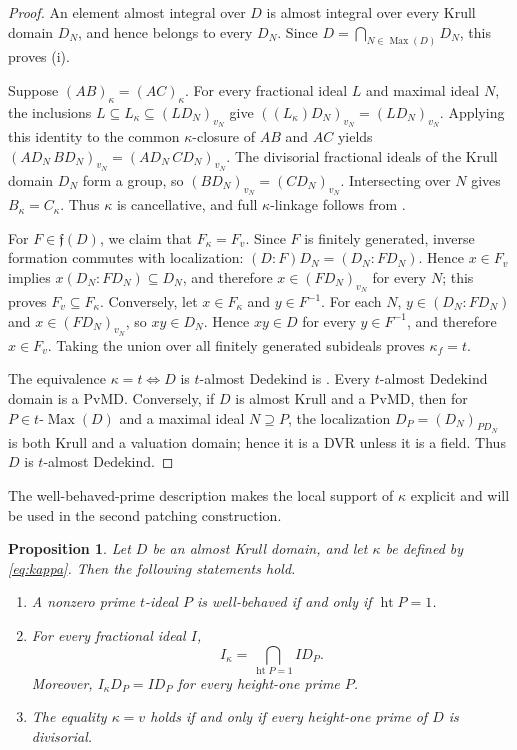 \documentclass[11pt]{amsart}
\newtheorem{proposition}[proposition]{Proposition}
\theoremstyle{definition}
\theoremstyle{remark}
\newcommand{\fcal}{\mathfrak f}
\newcommand{\PvMD}{\mathrm{PvMD}}
\newcommand{\Max}{\operatorname{Max}}
\newcommand{\tMax}{t\text{-}\operatorname{Max}}
\begin{document}
\begin{proof}
An element almost integral over $D$ is almost integral over every Krull domain
$D_N$, and hence belongs to every $D_N$.  Since
$D=\bigcap_{N\in\Max(D)}D_N$, this proves (i).

Suppose $(AB)_\kappa=(AC)_\kappa$.  For every fractional ideal $L$ and
maximal ideal $N$, the inclusions
$L\subseteq L_\kappa\subseteq(LD_N)_{v_N}$ give
$((L_\kappa)D_N)_{v_N}=(LD_N)_{v_N}$.  Applying this identity to the common
$\kappa$-closure of $AB$ and $AC$ yields
$(AD_N\,BD_N)_{v_N}=(AD_N\,CD_N)_{v_N}$.  The divisorial fractional ideals of the
Krull domain $D_N$ form a group, so
$(BD_N)_{v_N}=(CD_N)_{v_N}$.  Intersecting over $N$ gives
$B_\kappa=C_\kappa$.  Thus $\kappa$ is cancellative, and full
$\kappa$-linkage follows from .

For $F\in\fcal(D)$, we claim that $F_\kappa=F_v$.  Since $F$ is finitely
generated, inverse formation commutes with localization:
$(D:F)D_N=(D_N:FD_N)$.  Hence $x\in F_v$ implies
$x(D_N:FD_N)\subseteq D_N$, and therefore
$x\in(FD_N)_{v_N}$ for every $N$; this proves $F_v\subseteq F_\kappa$.
Conversely, let $x\in F_\kappa$ and $y\in F^{-1}$.  For each $N$,
$y\in(D_N:FD_N)$ and $x\in(FD_N)_{v_N}$, so $xy\in D_N$.  Hence
$xy\in D$ for every $y\in F^{-1}$, and therefore $x\in F_v$.  Taking the
union over all finitely generated subideals proves $\kappa_f=t$.

The equivalence $\kappa=t\iff D$ is $t$-almost Dedekind is
\cite[Propositions~1.6 and~1.7]{ElBaghdadiIzelgueTamoussit}.  Every
$t$-almost Dedekind domain is a $\PvMD$.  Conversely, if $D$ is almost Krull
and a $\PvMD$, then for $P\in\tMax(D)$ and a maximal ideal $N\supseteq P$,
the localization $D_P=(D_N)_{PD_N}$ is both Krull and a valuation domain;
hence it is a DVR unless it is a field.  Thus $D$ is $t$-almost Dedekind.
\end{proof}

The well-behaved-prime description makes the local support of $\kappa$
explicit and will be used in the second patching construction.

\begin{proposition}\label{prop:well-behaved}
Let $D$ be an almost Krull domain, and let $\kappa$ be defined by
\eqref{eq:kappa}.  Then the following statements hold.
\begin{enumerate}[label=\textup{(\roman*)}]
\item A nonzero prime $t$-ideal $P$ is well-behaved if and only if
      $\operatorname{ht}P=1$.
\item For every fractional ideal $I$,
      \begin{equation}\label{eq:kappa-height-one}
       I_\kappa=\bigcap_{\operatorname{ht}P=1}ID_P.
      \end{equation}
      Moreover, $I_\kappa D_P=ID_P$ for every height-one prime $P$.
\item The equality $\kappa=v$ holds if and only if every height-one prime of
      $D$ is divisorial.
\end{enumerate}
\end{proposition}
\end{document}
